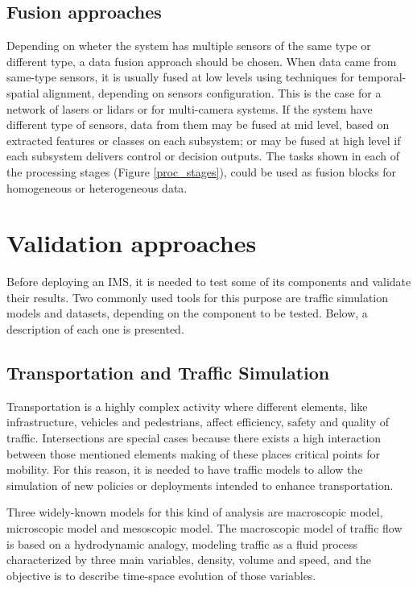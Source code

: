 \subsection{Fusion approaches}

Depending on wheter the system has multiple sensors of the same type or different type, a data fusion approach should be chosen. When data came from same-type sensors, it is usually fused at low levels using techniques for temporal-spatial alignment, depending on sensors configuration. This is the case for a network of lasers or lidars or for multi-camera systems. If the system have different type of sensors, data from them may be fused at mid level, based on extracted features or classes on each subsystem; or may be fused at high level if each subsystem delivers control or decision outputs. The tasks shown in each of the processing stages (Figure \ref{proc_stages}), could be used as fusion blocks for homogeneous or heterogeneous data.

\section{Validation approaches}

Before deploying an IMS, it is needed to test some of its components and validate their results. Two commonly used tools for this purpose are traffic simulation models and datasets, depending on the component to be tested. Below, a description of each one is presented.

\subsection{Transportation and Traffic Simulation}

Transportation is a highly complex activity where different elements, like infrastructure, vehicles and pedestrians, affect efficiency, safety and quality of traffic. Intersections are special cases because there exists a high interaction between those mentioned elements making of these places critical points for mobility. For this reason, it is needed to have traffic models to allow the simulation of new policies or deployments intended to enhance transportation.

Three widely-known models for this kind of analysis are macroscopic model, microscopic model and mesoscopic model. The macroscopic model of traffic flow is based on a hydrodynamic analogy, modeling traffic as a fluid process characterized by three main variables, density, volume and speed, and the objective is to describe time-space evolution of those variables.

